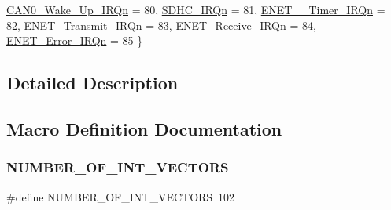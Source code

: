 \begin{DoxyCompactItemize}
\mbox{\hyperlink{group___interrupt__vector__numbers_gga666eb0caeb12ec0e281415592ae89083a48386f75afd4280dbded9e98620284c9}{C\+A\+N0\+\_\+\+Wake\+\_\+\+Up\+\_\+\+I\+R\+Qn}} = 80, 
\mbox{\hyperlink{group___interrupt__vector__numbers_gga666eb0caeb12ec0e281415592ae89083a3ef698a0344956fa80957f89eded8f95}{S\+D\+H\+C\+\_\+\+I\+R\+Qn}} = 81, 
\newline
\mbox{\hyperlink{group___interrupt__vector__numbers_gga666eb0caeb12ec0e281415592ae89083abad338d6856a8f9b0d518a37d15d141c}{E\+N\+E\+T\+\_\+\_\+\+Timer\+\_\+\+I\+R\+Qn}} = 82, 
\mbox{\hyperlink{group___interrupt__vector__numbers_gga666eb0caeb12ec0e281415592ae89083ac4e6005822fd23a07b3f8f21833ec274}{E\+N\+E\+T\+\_\+\+Transmit\+\_\+\+I\+R\+Qn}} = 83, 
\mbox{\hyperlink{group___interrupt__vector__numbers_gga666eb0caeb12ec0e281415592ae89083a870426305ade1c60a291777a76b17021}{E\+N\+E\+T\+\_\+\+Receive\+\_\+\+I\+R\+Qn}} = 84, 
\mbox{\hyperlink{group___interrupt__vector__numbers_gga666eb0caeb12ec0e281415592ae89083ab6f067a315d7c97896d189b1c62c763e}{E\+N\+E\+T\+\_\+\+Error\+\_\+\+I\+R\+Qn}} = 85
 \}
\end{DoxyCompactItemize}


\subsection{Detailed Description}


\subsection{Macro Definition Documentation}
\mbox{\label{group___interrupt__vector__numbers_gafe46d81f4fa2c4f6ed1361f24f046fa8}} 
\subsubsection{\texorpdfstring{N\+U\+M\+B\+E\+R\+\_\+\+O\+F\+\_\+\+I\+N\+T\+\_\+\+V\+E\+C\+T\+O\+RS}{NUMBER\_OF\_INT\_VECTORS}}
{\footnotesize\ttfamily \#define N\+U\+M\+B\+E\+R\+\_\+\+O\+F\+\_\+\+I\+N\+T\+\_\+\+V\+E\+C\+T\+O\+RS~102}

